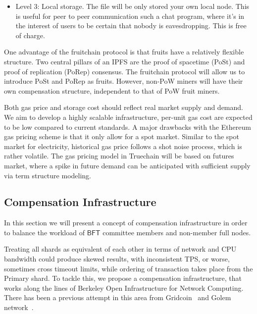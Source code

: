 \documentclass[9pt,oneside]{amsart}
\begin{document}
\begin{multicols}{2}
\begin{itemize}
	\item Level 3: Local storage. The file will be only stored your own local node. This is useful for peer to peer communication such a chat program, where it's in the interest of users to be certain that nobody is eavesdropping. This is free of charge. 
\end{itemize}

One advantage of the fruitchain protocol is that fruits have a relatively flexible structure. Two central pillars of an IPFS are the proof of spacetime (PoSt) and proof of replication (PoRep) consensus. The fruitchain protocol will allow us to introduce PoSt and PoRep as fruits. However, non-PoW miners will have their own compensation structure, independent to that of PoW fruit miners. 

Both gas price and storage cost should reflect real market supply and demand. We aim to develop a highly scalable infrastructure, per-unit gas cost are expected to be low compared to current standards. A major drawbacks with the Ethereum gas pricing scheme is that it only allow for a spot market. Similar to the spot market for electricity, historical gas price follows a shot noise process, which is rather volatile. The gas pricing model in Truechain will be based on futures market, where a spike in future demand can be anticipated with sufficient supply via term structure modeling. 


\subsection{Compensation Infrastructure}

In this section we will present a concept of compensation infrastructure in order to balance the workload of $\mathsf{BFT}$
committee members and non-member full nodes.

Treating all shards as equivalent of each other in terms of network and CPU bandwidth could produce skewed results,
with inconsistent TPS, or worse, sometimes cross timeout limits, while ordering of transaction takes place from the
Primary shard. To tackle this, we propose a compensation infrastructure, that works along the lines of Berkeley Open
Infrastructure for Network Computing. There has been a previous attempt in this area from Gridcoin~\cite{gridwhitepaper}
and Golem network~\cite{golemwhitepaper}.


\end{multicols}
\end{document}
